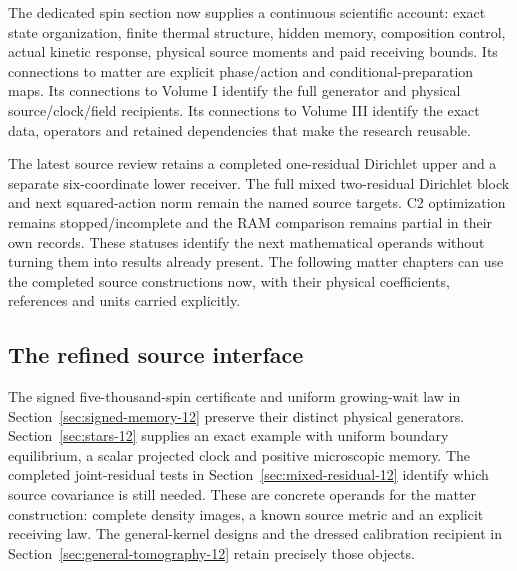 The dedicated spin section now supplies a continuous scientific account: exact state organization, finite thermal structure, hidden memory, composition control, actual kinetic response, physical source moments and paid receiving bounds. Its connections to matter are explicit phase/action and conditional-preparation maps. Its connections to Volume I identify the full generator and physical source/clock/field recipients. Its connections to Volume III identify the exact data, operators and retained dependencies that make the research reusable.

The latest source review retains a completed one-residual Dirichlet upper and a separate six-coordinate lower receiver. The full mixed two-residual Dirichlet block and next squared-action norm remain the named source targets. C2 optimization remains stopped/incomplete and the RAM comparison remains partial in their own records. These statuses identify the next mathematical operands without turning them into results already present. The following matter chapters can use the completed source constructions now, with their physical coefficients, references and units carried explicitly.

\subsection{The refined source interface}
The signed five-thousand-spin certificate and uniform growing-wait law in
Section~\ref{sec:signed-memory-12} preserve their distinct physical
generators. Section~\ref{sec:stars-12} supplies an exact example with
uniform boundary equilibrium, a scalar projected clock and positive
microscopic memory. The completed joint-residual tests in
Section~\ref{sec:mixed-residual-12} identify which source covariance is
still needed. These are concrete operands for the matter construction:
complete density images, a known source metric and an explicit receiving
law. The general-kernel designs and the dressed calibration recipient in
Section~\ref{sec:general-tomography-12} retain precisely those objects.
